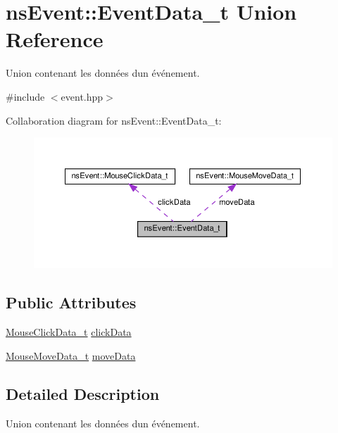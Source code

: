 \hypertarget{unionns_event_1_1_event_data__t}{}\section{ns\+Event\+:\+:Event\+Data\+\_\+t Union Reference}
\label{unionns_event_1_1_event_data__t}


Union contenant les données d\textquotesingle{}un événement.  




{\ttfamily \#include $<$event.\+hpp$>$}



Collaboration diagram for ns\+Event\+:\+:Event\+Data\+\_\+t\+:
\nopagebreak
\begin{figure}[H]
\begin{center}
\leavevmode
\includegraphics[width=350pt]{unionns_event_1_1_event_data__t__coll__graph}
\end{center}
\end{figure}
\subsection*{Public Attributes}
\begin{DoxyCompactItemize}
\item 
\hyperlink{structns_event_1_1_mouse_click_data__t}{Mouse\+Click\+Data\+\_\+t} \hyperlink{unionns_event_1_1_event_data__t_ac1478ee3007ce42a653e53c1200625bc}{click\+Data}
\item 
\hyperlink{structns_event_1_1_mouse_move_data__t}{Mouse\+Move\+Data\+\_\+t} \hyperlink{unionns_event_1_1_event_data__t_aac7ba31725a75d84fd32ea6a4d865a91}{move\+Data}
\end{DoxyCompactItemize}


\subsection{Detailed Description}
Union contenant les données d\textquotesingle{}un événement. 

